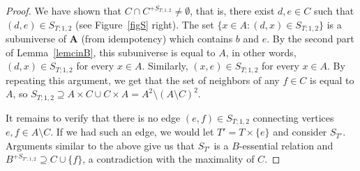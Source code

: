 \documentclass{amsart}
\theoremstyle{plain}
\theoremstyle{definition}
\begin{document}
\begin{proof}
  We have shown that $C\cap C^{+S_{T;1,2}}\neq \emptyset$, that is, there
  exist $d,e\in C$ such that $(d,e)\in S_{T;1,2}$ (see Figure~\ref{figS} right).  
	The set $\{x \in A \colon (d,x) \in S_{T;1,2}\}$ is a subuniverse of ${{\mathbf{A}}}$ (from idempotency) which contains $b$ and $e$. 
	By the second part of Lemma~\ref{lemcinB}, this subuniverse is equal to $A$, in other words, $(d,x)\in S_{T;1,2}$ for every $x\in A$.
  Similarly, $(x,e)\in S_{T;1,2}$ for every $x\in A$. By repeating this argument, we get
   that the set of neighbors of any $f\in C$ is equal to $A$, 
  so $S_{T;1,2}\supseteq A\times C\cup C\times A=A^2\setminus(A\setminus C)^2$.
  

  It remains to verify that there is no edge $(e,f)\in S_{T;1,2}$ connecting
  vertices $e,f\in
  A\setminus C$.
  If we had such an edge, we would let $T'=T\times \{e\}$ and consider
  $S_{T'}$. Arguments similar to the above give us that $S_{T'}$ is a  $B$-essential relation and 
  $B^{+S_{T';1,2}} \supseteq C\cup \{f\}$, a contradiction with the maximality of $C$.
\end{proof}
\end{document}
